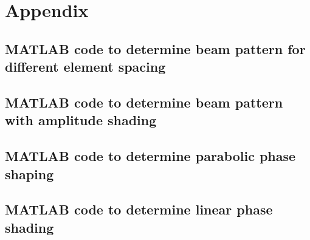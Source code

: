 \chapter*{Appendix}

\section{ MATLAB code to determine beam pattern for different element spacing } \label{ MATLAB code to determine beam pattern for different element spacing } 


\section{ MATLAB code to determine beam pattern with amplitude shading } \label{ MATLAB code to determine beam pattern with amplitude shading }


\section{ MATLAB code to determine parabolic phase shaping } \label{ MATLAB code to determine parabolic phase shaping }


\section{ MATLAB code to determine linear phase shading } \label{ MATLAB code to determine linear phase shading }



